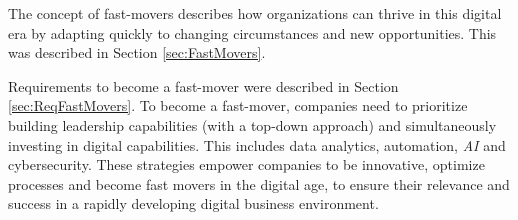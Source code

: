 \documentclass[a4]{scrartcl}
\begin{document}
	
	The concept of fast-movers describes how organizations can thrive in this digital era by adapting quickly to changing circumstances and new opportunities. This was described in Section \ref{sec:FastMovers}.
	
	Requirements to become a fast-mover were described in Section \ref{sec:ReqFastMovers}. To become a fast-mover, companies need to prioritize building leadership capabilities (with a top-down approach) and simultaneously investing in digital capabilities. This includes data analytics, automation, \textit{AI} and cybersecurity. These strategies empower companies to be innovative, optimize processes and become fast movers in the digital age, to ensure their relevance and success in a rapidly developing digital business environment.

	






	

	
	\newpage
	\begin{spacing}{0.5}
		\printbibliography
	\end{spacing}


	
	
	
	
	
	
\end{document}
